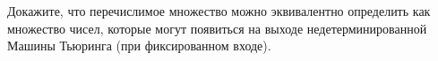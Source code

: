 Докажите, что перечислимое множество можно эквивалентно определить как множество чисел, которые могут появиться на выходе
недетерминированной Машины Тьюринга (при фиксированном входе).